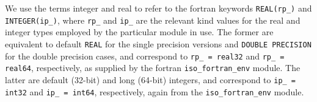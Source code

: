 
\galkinds
We use the terms integer and real to refer to the fortran
keywords {\tt REAL(rp\_)} and {\tt INTEGER(ip\_)}, where 
{\tt rp\_} and {\tt ip\_} are the relevant kind values for the
real and integer types employed by the particular module in use. 
The former are equivalent to
default {\tt REAL} for the single precision versions and 
{\tt DOUBLE PRECISION} for the double precision cases, and 
correspond to {\tt rp\_ = real32} and {\tt rp\_ = real64},
respectively, as supplied by the fortran {\tt iso\_fortran\_env} module.
The latter are default (32-bit) and long (64-bit) integers, and
correspond to {\tt ip\_ = int32} and {\tt ip\_ = int64},
respectively, again from the {\tt iso\_fortran\_env} module.
